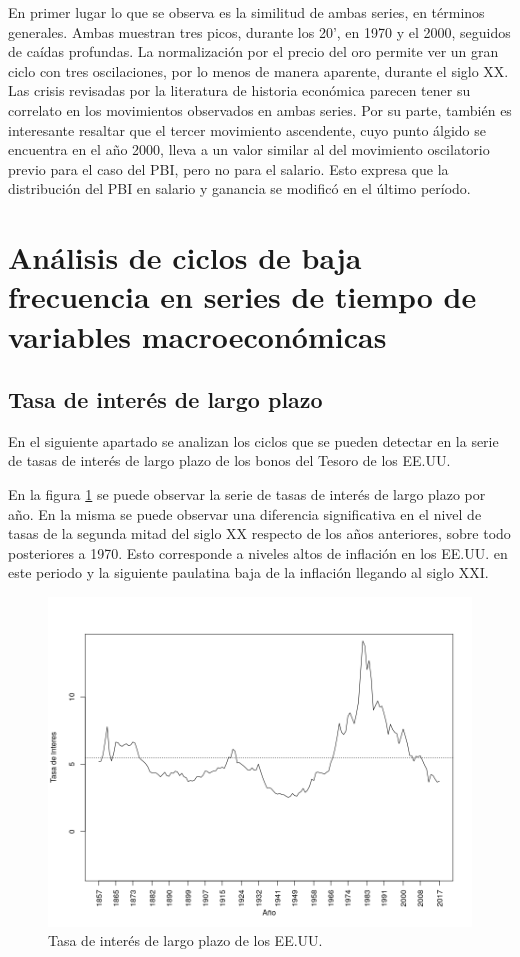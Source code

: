 \documentclass[a4paper]{article}
\begin{document}
En primer lugar lo que se observa es la similitud de ambas series, en términos generales. Ambas muestran tres picos, durante los 20', en 1970 y el 2000, seguidos de caídas profundas. La normalización por el precio del oro permite ver un gran ciclo con tres oscilaciones, por lo menos de manera aparente, durante el siglo XX. Las crisis revisadas por la literatura de historia económica parecen tener su correlato en los movimientos observados en ambas series. Por su parte, también es interesante resaltar que el tercer movimiento ascendente, cuyo punto álgido se encuentra en el año 2000, lleva a un valor similar al del movimiento oscilatorio previo para el caso del PBI, pero no para el salario. Esto expresa que la distribución del PBI en salario y ganancia se modificó en el último período. 

\section{Análisis de ciclos de baja frecuencia en series de tiempo de variables macroeconómicas}
\subsection{Tasa de interés de largo plazo}

En el siguiente apartado se analizan los ciclos que se pueden detectar en la serie de tasas de interés de largo plazo de los bonos del Tesoro de los EE.UU.

En la figura \ref{fig:ir_orig} se puede observar la serie de tasas de interés de largo plazo por año. En la misma se puede observar una diferencia significativa en el nivel de tasas de la segunda mitad del siglo XX respecto de los años anteriores, sobre todo posteriores a 1970. Esto corresponde a niveles altos de inflación en los EE.UU. en este periodo y la siguiente paulatina baja de la inflación llegando al siglo XXI.

\begin{figure}[H]
	\centering
	\includegraphics[width=0.75\linewidth]{ir_orig.png}
	
	\caption{Tasa de interés de largo plazo de los EE.UU.}
	\label{fig:ir_orig}
\end{figure}
\end{document}
